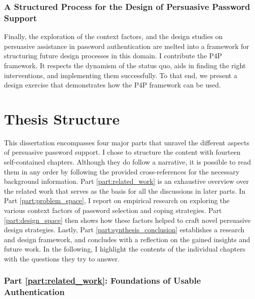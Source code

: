 \subsubsection{A Structured Process for the Design of Persuasive Password Support}
Finally, the exploration of the context factors, and the design studies on persuasive assistance in password authentication are melted into a framework for structuring future design processes in this domain. I contribute the \gls{P4P} framework. It respects the dynamism of the status quo, aids in finding the right interventions, and implementing them successfully. To that end, we present a design exercise that demonstrates how the \gls{P4P} framework can be used. 


\section{Thesis Structure}
This dissertation encompasses four major parts that unravel the different aspects of persuasive password support. I chose to structure the content with fourteen self-contained chapters. Although they do follow a narrative, it is possible to read them in any order by following the provided cross-references for the necessary background information. Part \ref{part:related_work} is an exhaustive overview over the related work that serves as the basis for all the discussions in later parts. In Part \ref{part:problem_space}, I report on empirical research on exploring the various context factors of password selection and coping strategies. Part \ref{part:design_space} then shows how these factors helped to craft novel persuasive design strategies. Lastly, Part \ref{part:synthesis_conclusion} establishes a research and design framework, and concludes with a reflection on the gained insights and future work. In the following, I highlight the contents of the individual chapters with the questions they try to answer.


\subsubsection{Part \ref{part:related_work}: Foundations of Usable Authentication}


